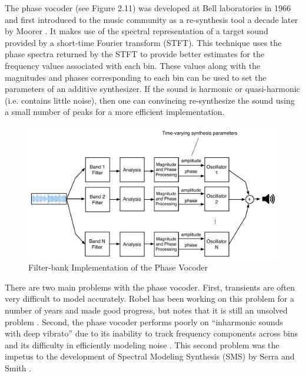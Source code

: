 \documentclass[a4paper,12pt]{report} 	%
\numberwithin{figure}{chapter}
\numberwithin{table}{chapter}
\numberwithin{equation}{chapter}
\begin{document}
\begin{flushleft}
The phase vocoder (see Figure 2.11) was developed at Bell laboratories in 1966 and first introduced to the music community as a re-synthesis tool a decade later by Moorer \cite{Moorer:1978ge}. It makes use of the spectral representation of a target sound provided by a short-time Fourier transform (STFT). This technique uses the phase spectra returned by the STFT to provide better estimates for the frequency values associated with each bin. These values along with the magnitudes and phases corresponding to each bin can be used to set the parameters of an additive synthesizer. If the sound is harmonic or quasi-harmonic (i.e. contains little noise), then one can convincing re-synthesize the sound using a small number of peaks for a more efficient implementation. 
\\
\begin{figure}[h!]
\begin{center}
\includegraphics[scale=0.45]{PhaseVocoder}
\caption[Phase Vocoder]{Filter-bank Implementation of the Phase Vocoder}
\end{center}
\end{figure}
There are two main problems with the phase vocoder. First, transients are often very difficult to model accurately. Robel has been working on this problem for a number of years \cite{Robel:2003vh,Robel:2010dp} and made good progress, but notes that it is still an unsolved problem \cite[p. 1]{Robel:2010dp}. Second, the phase vocoder performs poorly on ``inharmonic sounds with deep vibrato'' due to its inability to track frequency components across bins and its difficulty in efficiently modeling noise \cite[p. 13]{Serra:1990dk}. This second problem was the impetus to the development of Spectral Modeling Synthesis (SMS) by Serra and Smith \cite{Serra:1990dk}.


\end{flushleft}
\end{document}

